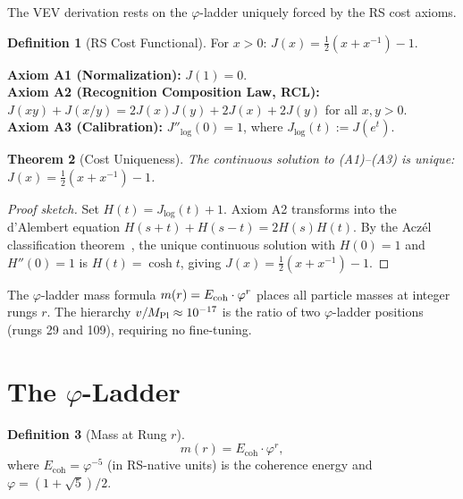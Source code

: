 \documentclass[12pt,a4paper]{article}
\newtheorem{theorem}{Theorem}[section]
\theoremstyle{definition}
\newtheorem{definition}[theorem]{Definition}
\theoremstyle{remark}
\begin{document}
The VEV derivation rests on the $\varphi$-ladder uniquely forced
by the RS cost axioms.

\begin{definition}[RS Cost Functional]
For $x > 0$: $J(x) = \tfrac{1}{2}(x + x^{-1}) - 1$.
\end{definition}

\noindent\textbf{Axiom A1 (Normalization):} $J(1) = 0$.\\
\textbf{Axiom A2 (Recognition Composition Law, RCL):}
$J(xy)+J(x/y)=2J(x)J(y)+2J(x)+2J(y)$ for all $x,y>0$.\\
\textbf{Axiom A3 (Calibration):} $J''_{\log}(0) = 1$, where
$J_{\log}(t) := J(e^t)$.

\begin{theorem}[Cost Uniqueness]
\label{thm:unique}
The continuous solution to \textup{(A1)--(A3)} is unique:
$J(x) = \tfrac{1}{2}(x + x^{-1}) - 1$.
\end{theorem}

\begin{proof}[Proof sketch]
Set $H(t) = J_{\log}(t)+1$.  Axiom A2 transforms into the d'Alembert
equation $H(s+t)+H(s-t)=2H(s)H(t)$.  By the Acz\'el classification
theorem~\cite{Aczel1966}, the unique continuous solution with $H(0)=1$
and $H''(0)=1$ is $H(t)=\cosh t$, giving
$J(x)=\tfrac{1}{2}(x+x^{-1})-1$.
\end{proof}

\noindent The $\varphi$-ladder mass formula $m(r) = E_{\rm coh}\cdot\varphi^r$
places all particle masses at integer rungs $r$.  The hierarchy
$v/M_{\rm Pl} \approx 10^{-17}$ is the ratio of two $\varphi$-ladder
positions (rungs 29 and 109), requiring no fine-tuning.

\section{The $\varphi$-Ladder}
\label{sec:ladder}

\begin{definition}[Mass at Rung $r$]
\begin{equation}
  m(r) = E_{\mathrm{coh}} \cdot \varphi^r,
\end{equation}
where $E_{\mathrm{coh}} = \varphi^{-5}$ (in RS-native units) is
the coherence energy and $\varphi = (1+\sqrt{5})/2$.
\end{definition}
\end{document}

